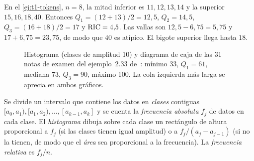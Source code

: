 \begin{ejemplo}\label{ej:t1-cuartiles}
En el \cref{ej:t1-tokens}, $n=8$, la mitad inferior es $11,12,13,14$ y la superior $15,16,18,40$. Entonces $Q_1=(12+13)/2=12{,}5$, $Q_2=14{,}5$, $Q_3=(16+18)/2=17$ y $\operatorname{RIC}=4{,}5$. Las vallas son $12{,}5-6{,}75=5{,}75$ y $17+6{,}75=23{,}75$, de modo que $40$ es atípico. El bigote superior llega hasta $18$.
\end{ejemplo}

\begin{figure}[ht]
\centering
{}
\caption{Histograma (clases de amplitud 10) y diagrama de caja de las 31 notas de examen del ejemplo~2.33 de~\cite{openstax}: mínimo 33, $Q_1=61$, mediana 73, $Q_3=90$, máximo 100. La cola izquierda más larga se aprecia en ambos gráficos.}\label{fig:t1-hist-caja}
\end{figure}

\begin{definicion}[Histograma]\label{def:t1-histograma}
Se divide un intervalo que contiene los datos en \emph{clases} contiguas $[a_0,a_1),[a_1,a_2),\dots,[a_{k-1},a_k]$ y se cuenta la \emph{frecuencia absoluta} $f_j$ de datos en cada clase. El \emph{histograma} dibuja sobre cada clase un rectángulo de altura proporcional a $f_j$ (si las clases tienen igual amplitud) o a $f_j/(a_j-a_{j-1})$ (si no la tienen, de modo que el \emph{área} sea proporcional a la frecuencia). La \emph{frecuencia relativa} es $f_j/n$.
\end{definicion}

